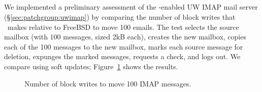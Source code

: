 \subsection {\Patchgroups}


%

\label{sec:evaluation:uwimap}
We implemented a preliminary assessment of the \patchgroup-enabled UW IMAP mail server
(\S\ref{sec:patchgroup:uwimap}) by comparing the number of block writes
that \Kudos\ makes relative to FreeBSD to move 100 emails. The test
selects the source mailbox (with 100 messages, sized 2kB each),
creates the new mailbox, copies each of the 100 messages to the new
mailbox, marks each source message for deletion, expunges the marked
messages, requests a check, and logs out. We compare using soft updates;
Figure~\ref{fig:imap-compare} shows the results.

\begin{figure}[t]
\caption{\label{fig:imap-compare} Number of block writes to move 100
  IMAP messages.}
\end{figure}
